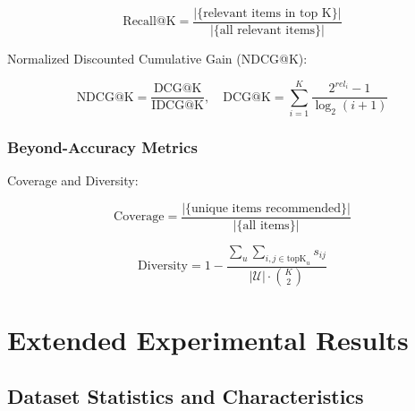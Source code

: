 \begin{equation}
\text{Recall@K} = \frac{|\{ \text{relevant items in top K} \}|}{|\{ \text{all relevant items} \}|}
\end{equation}

Normalized Discounted Cumulative Gain (NDCG@K):

\begin{equation}
\text{NDCG@K} = \frac{\text{DCG@K}}{\text{IDCG@K}}, \quad \text{DCG@K} = \sum_{i=1}^K \frac{2^{rel_i} - 1}{\log_2(i+1)}
\end{equation}

\subsubsection{Beyond-Accuracy Metrics}

Coverage and Diversity:

\begin{equation}
\text{Coverage} = \frac{|\{ \text{unique items recommended} \}|}{|\{ \text{all items} \}|}
\end{equation}

\begin{equation}
\text{Diversity} = 1 - \frac{\sum_{u} \sum_{i,j \in \text{topK}_u} s_{ij}}{|\mathcal{U}| \cdot \binom{K}{2}}
\end{equation}

\section{Extended Experimental Results}
\label{appendix:experiments}

\subsection{Dataset Statistics and Characteristics}

